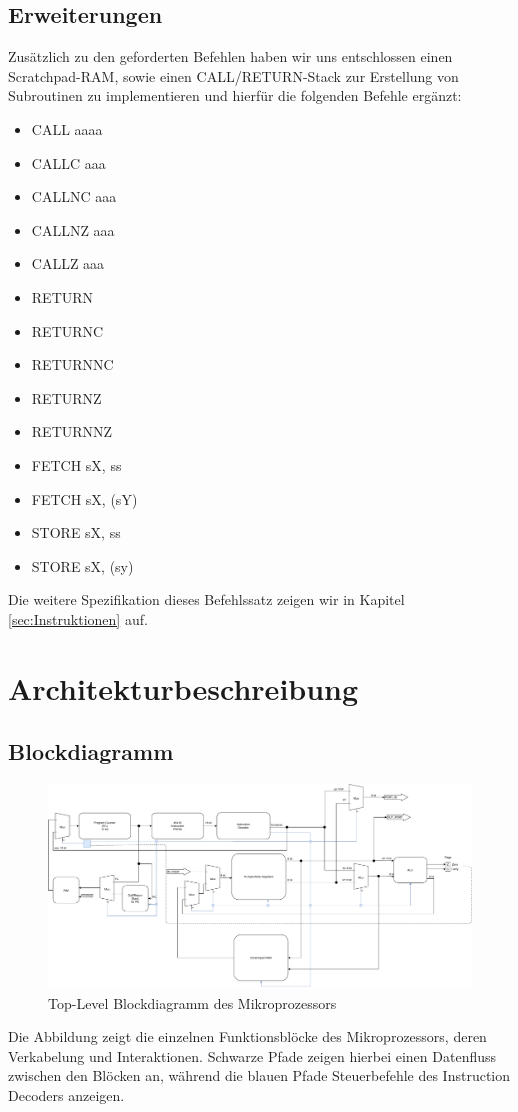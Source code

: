 \documentclass{scrartcl}
\begin{document}
\subsection{Erweiterungen}
Zusätzlich zu den geforderten Befehlen haben wir uns entschlossen einen Scratchpad-RAM, sowie einen CALL/RETURN-Stack zur Erstellung von Subroutinen zu implementieren und hierfür die folgenden Befehle ergänzt:
\begin{multicols}{3}
\begin{itemize}
    \item CALL aaaa
    \item CALLC aaa
    \item CALLNC aaa
    \item CALLNZ aaa
    \item CALLZ aaa
    \item RETURN
    \item RETURNC
    \item RETURNNC
    \item RETURNZ
    \item RETURNNZ
    \item FETCH sX, ss
    \item FETCH sX, (sY)
    \item STORE sX, ss
    \item STORE sX, (sy)
\end{itemize}
\end{multicols}

Die weitere Spezifikation dieses Befehlssatz zeigen wir in Kapitel \ref{sec:Instruktionen} auf.

\section{Architekturbeschreibung}\label{sec:Architekturbeschreibung}
\subsection{Blockdiagramm}
\begin{figure}[H]
    \centering
    \includegraphics[width=\textwidth]{Blockdiagram.pdf}
    \caption{Top-Level Blockdiagramm des Mikroprozessors}
    \label{fig:toplevel_blockdiagramm}
\end{figure}
Die Abbildung zeigt die einzelnen Funktionsblöcke des Mikroprozessors, deren Verkabelung und Interaktionen. Schwarze Pfade zeigen hierbei einen Datenfluss zwischen den Blöcken an, während die blauen Pfade Steuerbefehle des Instruction Decoders anzeigen.
\end{document}

